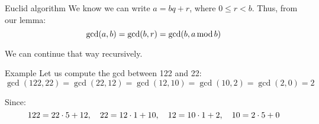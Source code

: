 \documentclass[a4paper]{article}
\begin{document}
\begin{parag}{Euclid algorithm}
    We know we can write $a = bq + r$, where $0 \leq r < b$. Thus, from our lemma: 
    \[\gcd\left(a, b\right) = \gcd\left(b, r\right) = \gcd\left(b, a \Mod b\right)\]
    
    We can continue that way recursively.

    \begin{subparag}{Example}
        Let us compute the gcd between 122 and 22: 
        \[\gcd\left(122, 22\right) = \gcd\left(22, 12\right) = \gcd\left(12, 10\right) = \gcd\left(10, 2\right) = \gcd\left(2, 0\right) = 2\]
        
        Since: 
        \[122 = 22\cdot 5 + 12, \quad 22 = 12\cdot 1 + 10, \quad 12 = 10\cdot 1 + 2, \quad 10 = 2\cdot 5 + 0\]
        
    \end{subparag}
\end{parag}
\end{document}
